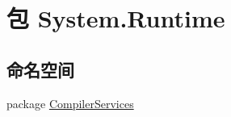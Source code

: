\hypertarget{namespace_system_1_1_runtime}{\section{包 System.\-Runtime}
\label{namespace_system_1_1_runtime}
}
\subsection*{命名空间}
\begin{DoxyCompactItemize}
\item 
package \hyperlink{namespace_system_1_1_runtime_1_1_compiler_services}{Compiler\-Services}
\end{DoxyCompactItemize}
